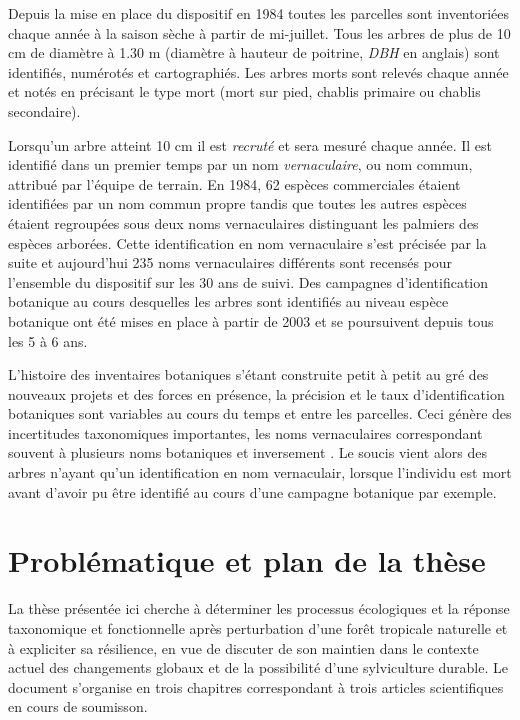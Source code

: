 \documentclass[
  11pt,
  french,
  A4paper,
  extrafontsizes,onecolumn,openright
  ]{memoir}
\begin{document}
Depuis la mise en place du dispositif en 1984 toutes les parcelles sont
inventoriées chaque année à la saison sèche à partir de mi-juillet. Tous
les arbres de plus de 10 cm de diamètre à 1.30 m (diamètre à hauteur de
poitrine, \emph{DBH} en anglais) sont identifiés, numérotés et
cartographiés. Les arbres morts sont relevés chaque année et notés en
précisant le type mort (mort sur pied, chablis primaire ou chablis
secondaire).

Lorsqu'un arbre atteint 10 cm il est \emph{recruté} et sera mesuré
chaque année. Il est identifié dans un premier temps par un nom
\emph{vernaculaire}, ou nom commun, attribué par l'équipe de terrain. En
1984, 62 espèces commerciales étaient identifiées par un nom commun
propre tandis que toutes les autres espèces étaient regroupées sous deux
noms vernaculaires distinguant les palmiers des espèces arborées. Cette
identification en nom vernaculaire s'est précisée par la suite et
aujourd'hui 235 noms vernaculaires différents sont recensés pour
l'ensemble du dispositif sur les 30 ans de suivi. Des campagnes
d'identification botanique au cours desquelles les arbres sont
identifiés au niveau espèce botanique ont été mises en place à partir de
2003 et se poursuivent depuis tous les 5 à 6 ans.

L'histoire des inventaires botaniques s'étant construite petit à petit
au gré des nouveaux projets et des forces en présence, la précision et
le taux d'identification botaniques sont variables au cours du temps et
entre les parcelles. Ceci génère des incertitudes taxonomiques
importantes, les noms vernaculaires correspondant souvent à plusieurs
noms botaniques et inversement \autocite{Oldeman1968}. Le soucis vient
alors des arbres n'ayant qu'un identification en nom vernaculair,
lorsque l'individu est mort avant d'avoir pu être identifié au cours
d'une campagne botanique par exemple.

\section{Problématique et plan de la
thèse}\label{problematique-et-plan-de-la-these}

La thèse présentée ici cherche à déterminer les processus écologiques et
la réponse taxonomique et fonctionnelle après perturbation d'une forêt
tropicale naturelle et à expliciter sa résilience, en vue de discuter de
son maintien dans le contexte actuel des changements globaux et de la
possibilité d'une sylviculture durable. Le document s'organise en trois
chapitres correspondant à trois articles scientifiques en cours de
soumisson.
\end{document}
